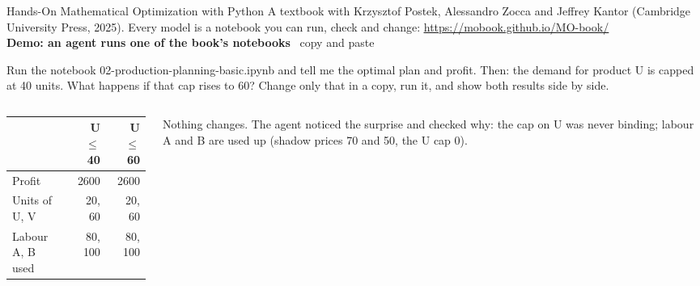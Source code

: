 \documentclass[aspectratio=169,11pt]{beamer}
\let\oldurl\url
\renewcommand{\url}[1]{{\color{linkblue}\uline{\oldurl{#1}}}}
\newcommand{\prompt}[2][\linewidth]{{\setlength{\fboxsep}{6pt}\colorbox{soft}{\parbox{\dimexpr#1-12pt}{\raggedright\hyphenpenalty=10000\exhyphenpenalty=10000\small #2}}}}
\newcommand{\copyhint}{{\scriptsize\color{calm}\faCopy[regular]\ copy and paste}}
\begin{document}
\begin{frame}{Hands-On Mathematical Optimization with Python}
\small
A textbook with Krzysztof Postek, Alessandro Zocca and Jeffrey Kantor (Cambridge University Press, 2025). Every model is a notebook you can run, check and change: \url{https://mobook.github.io/MO-book/}\\[0.6em]
\textbf{Demo: an agent runs one of the book's notebooks} \copyhint\\[0.2em]
\prompt[\textwidth]{Run the notebook 02-production-planning-basic.ipynb and tell me the optimal plan and profit. Then: the demand for product U is capped at 40 units. What happens if that cap rises to 60? Change only that in a copy, run it, and show both results side by side.}\par
\vspace{0.8em}
\begin{columns}[T]
\begin{column}{0.44\textwidth}
\footnotesize
\begin{tabular}{@{}lrr@{}}
\toprule
& U $\le$ 40 & U $\le$ 60\\
\midrule
Profit & 2600 & 2600\\
Units of U, V & 20, 60 & 20, 60\\
Labour A, B used & 80, 100 & 80, 100\\
\bottomrule
\end{tabular}
\end{column}
\begin{column}{0.52\textwidth}
\footnotesize
\alert{Nothing changes.} The agent noticed the surprise and checked why: the cap on U was never binding; labour A and B are used up (shadow prices 70 and 50, the U cap 0).
\end{column}
\end{columns}
\end{frame}
\end{document}
